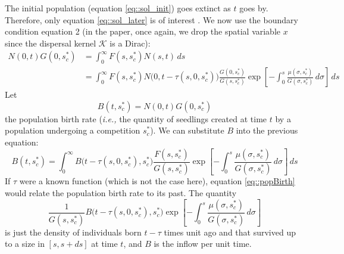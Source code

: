 \documentclass[letterpaper, 12pt]{article}
\newcommand {\ie}{\textit{i.e., }}
\newcommand {\s}{{s}^{*}}
\newcommand {\K}{\mathcal{K}}
\theoremstyle{theo}
\begin{document}
\begin{refsection}
\begin{onehalfspace}
The initial population (equation \eqref{eq::sol_init}) goes extinct as $ t $ goes by. Therefore, only equation \eqref{eq::sol_later} is of interest \citep{DeRoos1997}. We now use the boundary condition equation 2 (in the paper, once again, we drop the spatial variable $ x $ since the dispersal kernel $ \K $ is a Dirac):
\begin{align*}
	N(0, t) G(0, \s_c) &= \int_{0}^{\infty} F(s, \s_c) N(s, t) \, ds \\
		&= \int_{0}^{\infty} F(s, \s_c) N \big( 0, t - \tau(s, 0, \s_c) \big) \frac{G(0, \s_c)}{G(s, \s_c)} \exp \left[ -\int_{0}^{s} \frac{\mu(\sigma, \s_c)}{G(\sigma, \s_c)} \, d\sigma \right] \, ds
\end{align*}
Let
\[
	B(t, \s_c) = N(0, t) G(0, \s_c)
\]
the population birth rate (\ie the quantity of seedlings created at time $ t $ by a population undergoing a competition $ \s_c $). We can substitute $ B $ into the previous equation:
\begin{equation} \label{eq::popBirth}
	B(t, \s_c) = \int_{0}^{\infty} B \big(t - \tau(s, 0, \s_c), \s_c \big) \frac{F(s, \s_c)}{G(s, \s_c)} \exp \left[ -\int_{0}^{s} \frac{\mu(\sigma, \s_c)}{G(\sigma, \s_c)} \, d\sigma \right] \, ds
\end{equation}
If $ \tau $ were a known function (which is not the case here), equation \eqref{eq::popBirth} would relate the population birth rate to its past. The quantity
\[
	\frac{1}{G(s, \s_c)} B \big(t - \tau(s, 0, \s_c), \s_c \big) \exp \left[ -\int_{0}^{s} \frac{\mu(\sigma, \s_c)}{G(\sigma, \s_c)} \, d\sigma \right]
\]
is just the density of individuals born $ t - \tau $ times unit ago and that survived up to a size in $ [s, s + ds] $ at time $ t $, and $ B $ is the inflow per unit time.


\end{onehalfspace}
\end{refsection}
\end{document}
